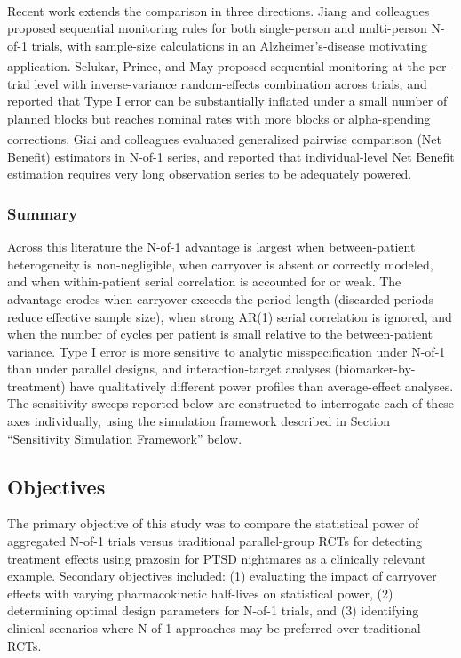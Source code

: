 \documentclass[
  11pt,
]{article}
\begin{document}
Recent work extends the comparison in three directions. Jiang and
colleagues\textsuperscript{}
proposed sequential monitoring rules for both single-person and
multi-person N-of-1 trials, with sample-size calculations in an
Alzheimer's-disease motivating application. Selukar, Prince, and
May\textsuperscript{}
proposed sequential monitoring at the per-trial level with
inverse-variance random-effects combination across trials, and reported
that Type I error can be substantially inflated under a small number of
planned blocks but reaches nominal rates with more blocks or
alpha-spending corrections. Giai and
colleagues\textsuperscript{}
evaluated generalized pairwise comparison (Net Benefit) estimators in
N-of-1 series, and reported that individual-level Net Benefit estimation
requires very long observation series to be adequately powered.

\subsubsection{Summary}\label{summary}

Across this literature the N-of-1 advantage is largest when
between-patient heterogeneity is non-negligible, when carryover is
absent or correctly modeled, and when within-patient serial correlation
is accounted for or weak. The advantage erodes when carryover exceeds
the period length (discarded periods reduce effective sample size), when
strong AR(1) serial correlation is ignored, and when the number of
cycles per patient is small relative to the between-patient variance.
Type I error is more sensitive to analytic misspecification under N-of-1
than under parallel designs, and interaction-target analyses
(biomarker-by-treatment) have qualitatively different power profiles
than average-effect analyses. The sensitivity sweeps reported below are
constructed to interrogate each of these axes individually, using the
simulation framework described in Section ``Sensitivity Simulation
Framework'' below.

\subsection{Objectives}\label{objectives}

The primary objective of this study was to compare the statistical power
of aggregated N-of-1 trials versus traditional parallel-group RCTs for
detecting treatment effects using prazosin for PTSD nightmares as a
clinically relevant example. Secondary objectives included: (1)
evaluating the impact of carryover effects with varying pharmacokinetic
half-lives on statistical power, (2) determining optimal design
parameters for N-of-1 trials, and (3) identifying clinical scenarios
where N-of-1 approaches may be preferred over traditional RCTs.
\end{document}
